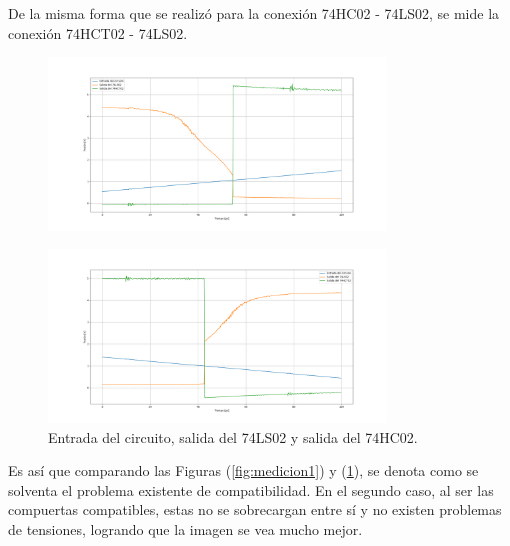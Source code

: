 De la misma forma que se realizó para la conexión 74HC02 - 74LS02, se mide la conexión 74HCT02 - 74LS02.
\begin{figure}[H]
\centering
	\includegraphics[width=0.8\textwidth]{ImagenesEjercicio2/scope_23_1.png}
\end{figure}
\begin{figure}[H]
\centering
	\includegraphics[width=0.8\textwidth]{ImagenesEjercicio2/scope_26_1.png}
\caption{Entrada del circuito, salida del 74LS02 y salida del 74HC02.}
\label{fig:medicion2}
\end{figure} 

Es así que comparando las Figuras (\ref{fig:medicion1}) y (\ref{fig:medicion2}), se denota como se solventa el problema existente de compatibilidad. En el segundo caso, al ser las compuertas compatibles, estas no se sobrecargan entre sí y no existen problemas de tensiones, logrando que la imagen se vea mucho mejor.

